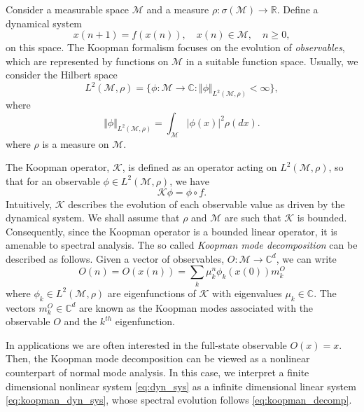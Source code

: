 \documentclass[%
 aip,
 cha,
 sd,%
 amsmath,amssymb,
 preprint,%
]{revtex4-1}
\begin{document}
Consider a measurable space $\mathcal{M}$ and a measure $\rho:\sigma\left(\mathcal{M}\right)\rightarrow\mathbb{R}$. 
Define a dynamical system 
\begin{equation}
x(n+1)=f\left(x(n)\right),\quad x(n)\in\mathcal{M}, \quad n\geq 0,
\label{eq:dyn_sys}
\end{equation}
on this space. The Koopman formalism focuses on the evolution of \textit{observables}, which are represented by functions on $\mathcal{M}$ in a suitable function space. Usually, we consider the Hilbert space
\[
L^2(\mathcal{M},\rho) = \{\phi:\mathcal{M}\rightarrow\mathbb{C}: \Vert\phi\Vert_{L^2(\mathcal{M},\rho)}<\infty\},
\]
where 
\[
\Vert\phi\Vert_{L^2(\mathcal{M},\rho)}=\int_{\mathcal{M}} \vert\phi(x)\vert^2 \rho(dx).
\]
where $\rho$ is a measure on $\mathcal{M}$. 

The Koopman operator, $\mathcal{K}$, is
defined as an operator acting on $L^{2}\left(\mathcal{M},\rho\right)$,
so that for an observable $\phi\in L^{2}\left(\mathcal{M},\rho\right)$,
we have
\begin{equation}
\mathcal{K}\phi=\phi\circ f.
\label{eq:koopman_dyn_sys}
\end{equation}
Intuitively, $\mathcal{K}$ describes the evolution of each observable value as driven by the dynamical system. We shall assume that $\rho$ and $\mathcal{M}$ are such that $\mathcal{K}$ is bounded. Consequently, since the Koopman operator is a bounded linear operator, it is amenable to spectral analysis. The so called {\it Koopman mode decomposition}
can be described as follows. Given a vector of observables, $O:\mathbb{\mathcal{M}\rightarrow C}^{d}$,
we can write 
\begin{equation}
O(n) = O(x(n)) = \sum_{k}\mu_{k}^n\phi_{k}\left(x(0)\right)m_{k}^{O}
\label{eq:koopman_decomp}
\end{equation}
where $\phi_{k}\in L^{2}\left(\mathcal{M},\rho\right)$ are eigenfunctions
of $\mathcal{K}$ with eigenvalues $\mu_{k}\in\mathbb{C}$. The vectors
$m_{k}^{O}\in\mathbb{C}^{d}$ are known as the Koopman modes associated
with the observable $O$ and the $k^{th}$ eigenfunction. 

In applications we are often interested in the full-state observable $O(x)=x$. Then, the Koopman mode decomposition can be viewed as a nonlinear counterpart of normal mode analysis. In this case, we interpret a finite dimensional nonlinear system \eqref{eq:dyn_sys} as a infinite dimensional linear system \eqref{eq:koopman_dyn_sys}, whose spectral evolution follows \eqref{eq:koopman_decomp}.  
\end{document}
